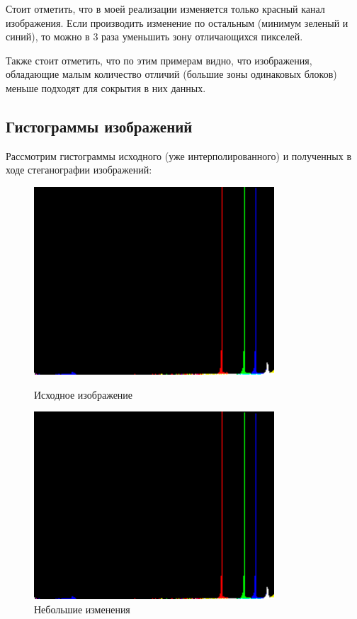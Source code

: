 \documentclass[a4paper]{article}
\begin{document}
  Стоит отметить, что в моей реализации изменяется только красный канал изображения.
  Если производить изменение по остальным (минимум зеленый и синий), то можно
  в 3 раза уменьшить зону отличающихся пикселей.

  Также стоит отметить, что по этим примерам видно, что изображения,
  обладающие малым количество отличий (большие зоны одинаковых блоков)
  меньше подходят для сокрытия в них данных.

  \subsection{Гистограммы изображений}

  Рассмотрим гистограммы исходного (уже интерполированного) и полученных
  в ходе стеганографии изображений:

  \begin{figure}[H]
    \centering
    \begin{minipage}[t]{0.4\textwidth}
        \centering
        \includegraphics[width=0.8\textwidth]{hist}
        \caption{Исходное изображение}
    \end{minipage}
    \hfill
    \begin{minipage}[t]{0.4\textwidth}
        \centering
        \includegraphics[width=0.8\textwidth]{hist_1}
        \caption{Небольшие изменения} 
    \end{minipage}
  \end{figure}
\end{document}
